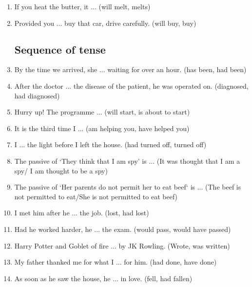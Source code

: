 \documentclass[12pt]{article}
\begin{document}
\begin{enumerate}
    \item If you heat the butter, it ... \hfill (will melt, melts)

    \item Provided you ... buy that car, drive carefully. \hfill (will buy, buy)

  \subsection{Sequence of tense}
    \item By the time we arrived, she ... waiting for over an hour. \hfill (has been, had been)

    \item After the doctor ... the disease of the patient, he was operated on. \hfill (diagnosed, had diagnosed)

    \item Hurry up! The programme ... \hfill (will start, is about to start)

    \item It is the third time I ... \hfill (am helping you, have helped you)

    \item I ... the light before I left the house. \hfill (had turned off, turned off)

    \item The passive of `They think that I am spy' is ... \hfill (It was thought that I am a spy/ I am thought to be a spy)

    \item The passive of `Her parents do not permit her to eat beef` is ... \hfill (The beef is not permitted to eat/She is not permitted to eat beef)

    \item I met him after he ... the job. \hfill (lost, had lost)

    \item Had he worked harder, he ... the exam. \hfill (would pass, would have passed)

    \item Harry Potter and Goblet of fire ... by JK Rowling. \hfill (Wrote, was written)

    \item My father thanked me for what I ... for him. \hfill (had done, have done)

    \item As soon as he saw the house, he ... in love. \hfill (fell, had fallen)


\end{enumerate}
\end{document}
